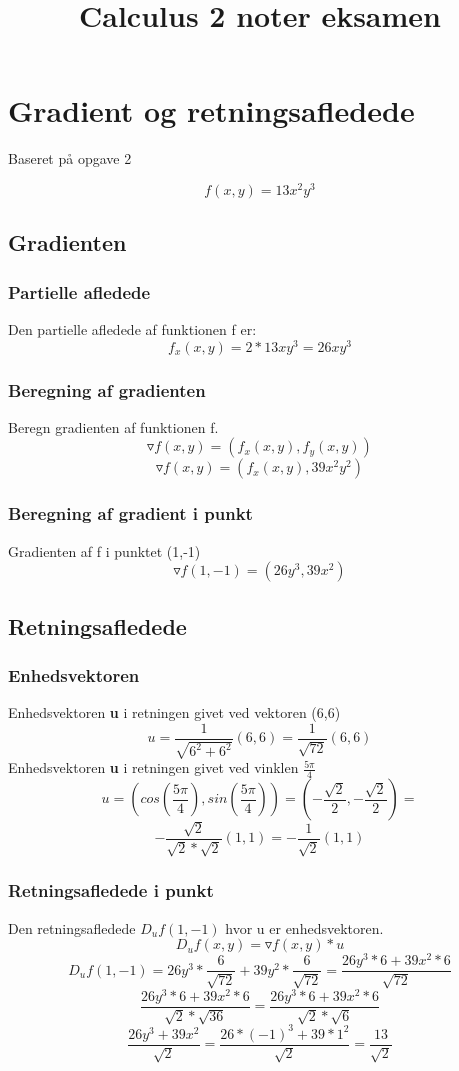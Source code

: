 \documentclass{article}
\title{Calculus 2 noter eksamen}
\begin{document}
\section{Gradient og retningsafledede}
{\tiny Baseret på opgave 2}

$$f(x,y)=13x^2 y^3$$

\subsection{Gradienten}

\subsubsection{Partielle afledede}
Den partielle afledede af funktionen f er:
$$f_x(x,y)=2*13xy^3 = 26xy^3$$

\subsubsection{Beregning af gradienten}
Beregn gradienten af funktionen f.
$$ \triangledown f(x,y)=(f_x(x,y),f_y(x,y))$$
$$ \triangledown f(x,y)=(f_x(x,y),39x^2y^2)$$

\subsubsection{Beregning af gradient i punkt}
Gradienten af f i punktet (1,-1)
$$\triangledown f(1,-1)=(26y^3,39x^2)$$

\subsection{Retningsafledede}

\subsubsection{Enhedsvektoren}
Enhedsvektoren {\bf u} i retningen givet ved vektoren (6,6)
$$u=\frac{1}{\sqrt{6^2 + 6^2}}(6,6)=\frac{1}{\sqrt{72}}(6,6)$$
Enhedsvektoren {\bf u} i retningen givet ved vinklen $\frac{5\pi}{4}$
$$u=(cos(\frac{5\pi}{4}), sin(\frac{5\pi}{4}))=(-\frac{\sqrt{2}}{2}, 
-\frac{\sqrt{2}}{2}) = $$
$$-\frac{\sqrt{2}}{\sqrt{2}*\sqrt{2}}(1,1)=-\frac{1}{\sqrt{2}}(1,1)$$

\subsubsection{Retningsafledede i punkt}
Den retningsafledede $D_u f(1,-1)$ hvor u er enhedsvektoren.
$$D_u f(x,y)= \triangledown f(x,y) * u$$
$$D_u f(1,-1) = 26y^3*\frac{6}{\sqrt{72}} + 39y^2*\frac{6}{\sqrt{72}} = 
\frac{26y^3*6+39x^2*6}{\sqrt{72}}$$
$$\frac{26y^3*6+39x^2*6}{\sqrt{2}*\sqrt{36}} = 
\frac{26y^3*6+39x^2*6}{\sqrt{2}*\sqrt{6}}$$
$$\frac{26y^3+39x^2}{\sqrt{2}} = \frac{26 * (-1)^3+39*1^2}{\sqrt{2}} = 
\frac{13}{\sqrt{2}}$$
\end{document}
